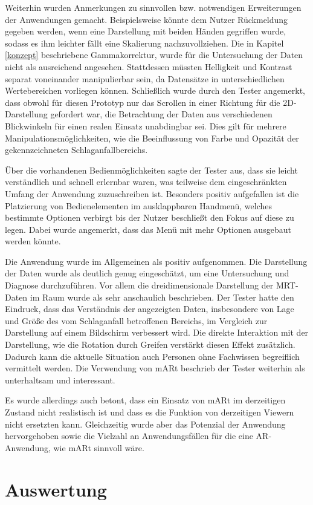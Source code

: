 Weiterhin wurden Anmerkungen zu sinnvollen bzw. notwendigen Erweiterungen der Anwendungen gemacht.
Beispielsweise könnte dem Nutzer Rückmeldung gegeben werden, wenn eine Darstellung mit beiden Händen gegriffen wurde, sodass es ihm leichter fällt eine Skalierung nachzuvollziehen.
Die in Kapitel \ref{konzept} beschriebene Gammakorrektur, wurde für die Untersuchung der Daten nicht als ausreichend angesehen. Stattdessen müssten Helligkeit und Kontrast separat voneinander manipulierbar sein, da Datensätze in unterschiedlichen Wertebereichen vorliegen können. 
Schließlich wurde durch den Tester angemerkt, dass obwohl für diesen Prototyp nur das Scrollen in einer Richtung für die 2D-Darstellung gefordert war, die Betrachtung der Daten aus verschiedenen Blickwinkeln für einen realen Einsatz unabdingbar sei. Dies gilt für mehrere Manipulationsmöglichkeiten, wie die Beeinflussung von Farbe und Opazität der gekennzeichneten Schlaganfallbereichs.

Über die vorhandenen Bedienmöglichkeiten sagte der Tester aus, dass sie leicht verständlich und schnell erlernbar waren, was teilweise dem eingeschränkten Umfang der Anwendung zuzuschreiben ist.
Besonders positiv aufgefallen ist die Platzierung von Bedienelementen im ausklappbaren Handmenü, welches bestimmte Optionen verbirgt bis der Nutzer beschließt den Fokus auf diese zu legen. Dabei wurde angemerkt, dass das Menü mit mehr Optionen ausgebaut werden könnte. 

Die Anwendung wurde im Allgemeinen als positiv aufgenommen. 
Die Darstellung der Daten wurde als deutlich genug eingeschätzt, um eine Untersuchung und Diagnose durchzuführen. 
Vor allem die dreidimensionale Darstellung der MRT-Daten im Raum wurde als sehr anschaulich beschrieben. Der Tester hatte den Eindruck, dass das Verständnis der angezeigten Daten, insbesondere von Lage und Größe des vom Schlaganfall betroffenen Bereichs, im Vergleich zur Darstellung auf einem Bildschirm verbessert wird. Die direkte Interaktion mit der Darstellung, wie die Rotation durch Greifen verstärkt diesen Effekt zusätzlich. Dadurch kann die aktuelle Situation auch Personen ohne Fachwissen begreiflich vermittelt werden. 
Die Verwendung von mARt beschrieb der Tester weiterhin als unterhaltsam und interessant.

Es wurde allerdings auch betont, dass ein Einsatz von mARt im derzeitigen Zustand nicht realistisch ist und dass es die Funktion von derzeitigen Viewern nicht ersetzten kann. Gleichzeitig wurde aber das Potenzial der Anwendung hervorgehoben sowie die Vielzahl an Anwendungsfällen für die eine AR-Anwendung, wie mARt sinnvoll wäre. 

\section{Auswertung}
